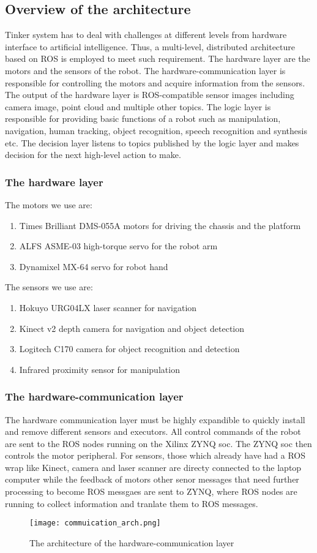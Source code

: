 \subsection{Overview of the architecture}
Tinker system has to deal with challenges at different levels from hardware interface to artificial intelligence. Thus, a multi-level, distributed architecture based on ROS is employed to meet such requirement. The hardware layer are the motors and the sensors of the robot. The hardware-communication layer is responsible for controlling the motors and acquire information from the sensors. The output of the hardware layer is ROS-compatible sensor images including camera image, point cloud and multiple other topics. The logic layer is responsible for providing basic functions of a robot such as manipulation, navigation, human tracking, object recognition, speech recognition and synthesis etc. The decision layer listens to topics published by the logic layer and makes decision for the next high-level action to make.
\subsubsection{The hardware layer}

The motors we use are:
\begin{enumerate}
    \item Times Brilliant DMS-055A motors for driving the chassis and the platform
    \item ALFS ASME-03 high-torque servo for the robot arm
    \item Dynamixel MX-64 servo for robot hand
\end{enumerate}
The sensors we use are:
\begin{enumerate}
    \item Hokuyo URG04LX laser scanner for navigation
    \item Kinect v2 depth camera for navigation and object detection
    \item Logitech C170 camera for object recognition and detection
    \item Infrared proximity sensor for manipulation
\end{enumerate}
\subsubsection{The hardware-communication layer}
The hardware communication layer must be highly expandible to quickly install and remove different sensors and executors. All control commands of the robot are sent to the ROS nodes running on the Xilinx ZYNQ soc. The ZYNQ soc then controls the motor peripheral. 
For sensors, those which already have had a ROS wrap like Kinect, camera and laser scanner are directy connected to the laptop computer while the feedback of motors other senor messages that need further processing to become ROS messgaes are sent to ZYNQ, where ROS nodes are running to collect information and tranlate them to ROS messages.
\begin{figure}[!t]
	\centering
    \texttt{[image: commuication\_arch.png]}
    \caption{The architecture of the hardware-communication layer}
    \label{arch_comm}
\end{figure}

